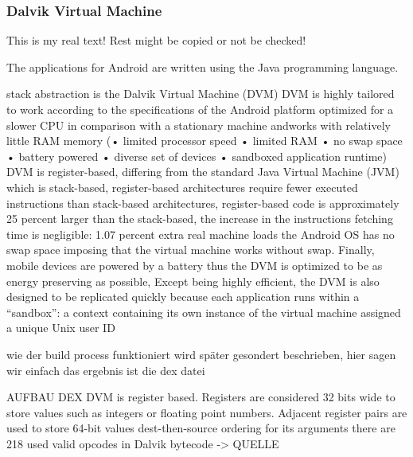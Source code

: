 \subsubsection{Dalvik Virtual Machine} \label{subsubsection:android-evolution-dvm}
This is my real text! Rest might be copied or not be checked!


%
The applications for Android are written using the Java programming language.

stack abstraction is the Dalvik Virtual Machine (DVM)\newline
DVM is highly tailored to work according to the specifications of the Android platform\newline
optimized for a slower CPU in comparison with a stationary machine andworks with relatively little RAM memory (• limited processor speed
• limited RAM
• no swap space
• battery powered
• diverse set of devices
• sandboxed application runtime)\cite{ehringerDalvik}\newline
DVM is register-based, differing from the standard Java Virtual Machine (JVM) which is stack-based, register-based architectures require fewer executed instructions than stack-based architectures, register-based code is approximately 25 percent larger than the stack-based, the increase in the instructions fetching time is negligible: 1.07 percent extra real machine loads\cite{ehringerDalvik}\newline
the Android OS has no swap space imposing that the virtual machine works without swap. Finally, mobile devices are powered by a battery thus the DVM is optimized to be as energy preserving as possible, Except being highly efficient, the DVM is also designed to be replicated quickly because each application runs within a “sandbox”: a context containing its own instance of the virtual machine assigned a unique Unix user ID\newline

wie der build process funktioniert wird später gesondert beschrieben, hier sagen wir einfach das ergebnis ist die dex datei\newline

AUFBAU DEX
DVM is register based. Registers are considered 32 bits wide to store values such as integers or floating point numbers. Adjacent register pairs are used to store 64-bit values\newline
dest-then-source ordering for its arguments\newline
there are 218 used valid opcodes in Dalvik bytecode -> QUELLE \newline

